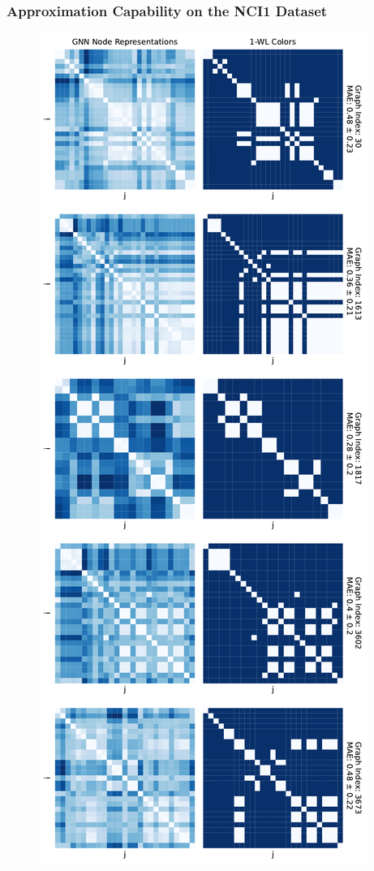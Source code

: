 \subsubsection{Approximation Capability on the NCI1 Dataset}
\begin{figure}[H]
    \centering
    \begin{minipage}[b]{0.45992852703\textwidth}
        \centering
        \includegraphics[width=\textwidth, left]{Figures/heatmaps_NCI1_0_k_wl_1.pdf}

\end{minipage}
\end{figure}
